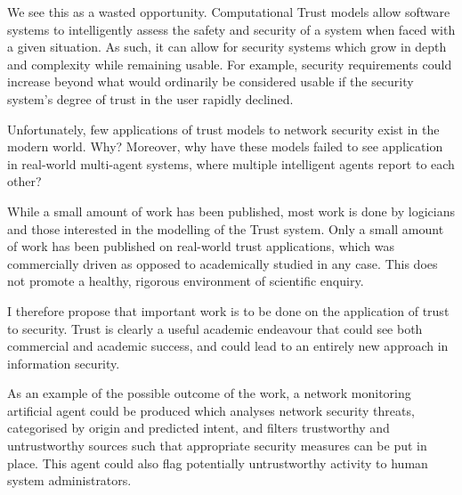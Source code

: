 \documentclass{tufte-handout}
\begin{document}
We see this as a wasted opportunity. Computational Trust models allow software systems to intelligently assess the safety and security of a system when faced with a given situation. As such, it can allow for security systems which grow in depth and complexity while remaining usable. For example, security requirements could increase beyond what would ordinarily be considered usable if the security system's degree of trust in the user rapidly declined. \par

Unfortunately, few applications of trust models to network security exist in the modern world. Why? Moreover, why have these models failed to see application in real-world multi-agent systems, where multiple intelligent agents report to each other?\par

While a small amount of work has been published, most work is done by logicians and those interested in the modelling of the Trust system. Only a small amount of work has been published on real-world trust applications, which was commercially driven as opposed to academically studied in any case\cite{Yan2003}. This does not promote a healthy, rigorous environment of scientific enquiry.\par

I therefore propose that important work is to be done on the application of trust to security. Trust is clearly a useful academic endeavour that could see both commercial and academic success, and could lead to an entirely new approach in information security.\par

As an example of the possible outcome of the work, a network monitoring artificial agent could be produced which analyses network security threats, categorised by origin and predicted intent, and filters trustworthy and untrustworthy sources such that appropriate security measures can be put in place. This agent could also flag potentially untrustworthy activity to human system administrators.\par
\end{document}
